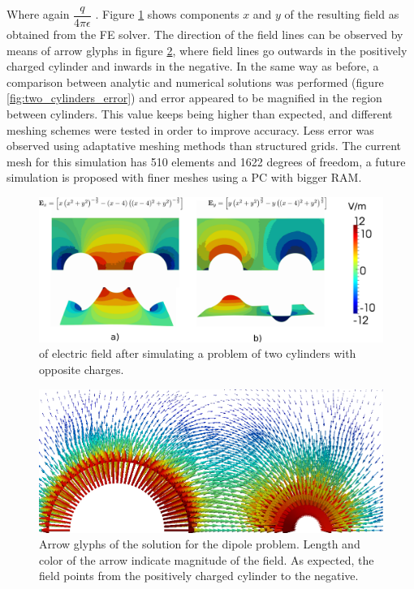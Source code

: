Where again $\dfrac{q}{4\pi \epsilon}$ . Figure \ref{fig:two_cylinders} shows components $x$ and $y$ of the resulting field as obtained from the FE solver. The direction of the field lines can be observed by means of arrow glyphs in figure \ref{fig:two_cylinders_glyph}, where field lines go outwards in the positively charged cylinder and inwards in the negative.
In the same way as before, a comparison between analytic and numerical solutions was performed (figure \ref{fig:two_cylinders_error}) and error appeared to be magnified in the region between cylinders. This value keeps being higher than expected, and different meshing schemes were tested in order to improve accuracy. Less error was observed using adaptative meshing methods than structured grids. The current mesh for this simulation has 510 elements and 1622 degrees of freedom, a future simulation is proposed with finer meshes using a PC with bigger RAM.

\begin{figure}
\centering
\includegraphics[scale=0.2]{./img/two_cylinders.pdf}
\caption{ of  electric field after simulating a problem of two cylinders with opposite charges. }
\label{fig:two_cylinders}
\end{figure}

\begin{figure}
\centering
\includegraphics[scale=0.5]{./img/two_cylinders_Gliphs}
\caption{Arrow glyphs of the solution for the dipole problem. Length and color of the arrow indicate magnitude of the field. As expected, the field points from the positively charged cylinder to the negative.}
\label{fig:two_cylinders_glyph}
\end{figure}

